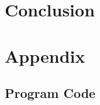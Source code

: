 \documentclass[12pt, a4paper]{article}
\begin{document}
	\section{Conclusion}


	\section{Appendix}
	\subsection{Program Code}
	
\end{document}
